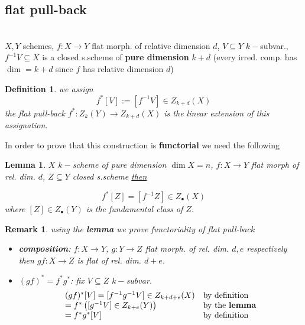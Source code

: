 \documentclass[oneside,a4paper,11pt]{amsbook}
\theoremstyle{pl}
\newtheorem{lem}{Lemma}[chapter]
\theoremstyle{df}
\newtheorem*{dfn}{Definition}
\theoremstyle{rm}
\newtheorem{rmk}{Remark}[chapter]
\newcommand{\nline}{
~\\
}%
\newcommand{\pa}[1]{
\left(#1\right)
}
\newcommand{\ul}[1]{
\underline{#1}
}
\newcommand{\mb}[1]{
\mathbb{#1}
}
\newcommand{\spc}[1]{
\text{Spec }#1
}
\begin{document}
\subsection{flat pull-back}
\nline
$X,Y$ schemes, $f:X\rightarrow Y$ flat morph. of relative dimension $d$, $V\subseteq Y$ $k-$subvar., $f^{-1}V\subseteq X$ is a closed s.scheme of \textbf{pure dimension} $k+d$ (every irred. comp. has $\dim=k+d$ since $f$ has relative dimension $d$)

\begin{dfn}
we assign 
\[
 f^*[V]:=[f^{-1}V]\in Z_{k+d}(X)
\]
the flat pull-back $f^*:Z_k(Y)\rightarrow Z_{k+d}(X)$ is the linear extension of this assignation.
\end{dfn}

In order to prove that this construction is \textbf{functorial} we need the following  

\begin{lem}
 $X$ $k-$scheme of pure dimension $\dim X=n$, $f:X\rightarrow Y$ flat morph of rel. dim. $d$, $Z\subseteq Y$ closed s.scheme \ul{then}
 \[
  f^*[Z]=[f^{-1}Z]\in Z_\bullet(X)
 \]
 where $[Z]\in Z_\bullet(Y)$ is the fundamental class of $Z$.
\end{lem}

\begin{rmk}
using the \textbf{lemma} we prove functoriality of flat pull-back
\begin{itemize}
 \item{\textbf{composition}: $f:X\rightarrow Y$, $g:Y\rightarrow Z$ flat morph. of rel. dim. $d,e$ respectively then $gf:X\rightarrow Z$ is flat of rel. dim. $d+e$.}
 \item{$(gf)^*=f^*g^*$: fix $V\subseteq Z$ $k-$subvar.
 \[
 \begin{array}{l l}
 (gf)^*[V]=[f^{-1}g^{-1}V]\in Z_{k+d+e}(X) &\text{by definition}\\
 =f^*\pa{[g^{-1}V]\in Z_{k+e}(Y)} &\text{by the \textbf{lemma}}\\
 =f^*g^*[V] &\text{by definition}\\
 \end{array}
 \]
 }
\end{itemize}

\end{rmk}
\end{document}

